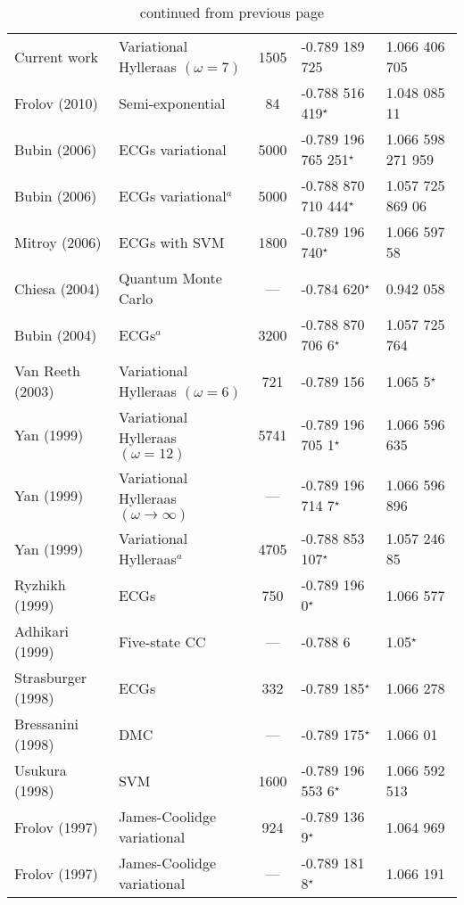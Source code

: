 \documentclass[Dissertation.tex]{subfiles}
\begin{document}
\begin{center}
\begin{longtable}{l l c l l}
\caption{continued from previous page}
\endlastfoot
\rowcolors{2}{gray!15}{white}
Current work & Variational Hylleraas $(\omega = 7)$ & 1505 & -0.789 189 725 & 1.066 406 705 \\
Frolov (2010) \cite{Frolov2010} & Semi-exponential & 84 & -0.788 516 419$^\star$ & 1.048 085 11 \\
Bubin (2006) \cite{Bubin2006} & ECGs variational & 5000 & -0.789 196 765 251$^\star$ & 1.066 598 271 959 \\
Bubin (2006) \cite{Bubin2006} & ECGs variational$^a$ & 5000 & -0.788 870 710 444$^\star$ & 1.057 725 869 06 \\
Mitroy (2006) \cite{Mitroy2006} & ECGs with SVM & 1800 & -0.789 196 740$^\star$ & 1.066 597 58 \\
Chiesa (2004) \cite{Chiesa2004} & Quantum Monte Carlo & --- & -0.784 620$^\star$ & 0.942 058 \\
Bubin (2004) \cite{Bubin2004} & ECGs$^a$ & 3200 & -0.788 870 706 6$^\star$ & 1.057 725 764 \\
Van Reeth (2003) \cite{VanReeth2003} & Variational Hylleraas $(\omega = 6)$ & 721 & -0.789 156 & 1.065 5$^\star$ \\
Yan (1999) \cite{Yan1999} & Variational Hylleraas $(\omega = 12)$ & 5741 & -0.789 196 705 1$^\star$ & 1.066 596 635 \\
Yan (1999) \cite{Yan1999} & Variational Hylleraas $(\omega \rightarrow \infty)$ & --- & -0.789 196 714 7$^\star$ & 1.066 596 896 \\
Yan (1999) \cite{Yan1999a} & Variational Hylleraas$^a$ & 4705 & -0.788 853 107$^\star$ & 1.057 246 85 \\
Ryzhikh (1999) \cite{Ryzhikh1999} & ECGs & 750 & -0.789 196 0$^\star$ & 1.066 577 \\
Adhikari (1999) \cite{Adhikari1999} & Five-state CC & --- & -0.788 6 & 1.05$^\star$ \\
Strasburger (1998) \cite{Strasburger1998} & ECGs & 332 & -0.789 185$^\star$ & 1.066 278 \\
Bressanini (1998) \cite{Bressanini1998} & DMC & --- & -0.789 175$^\star$ & 1.066 01 \\
Usukura (1998) \cite{Usukura1998} & SVM & 1600 & -0.789 196 553 6$^\star$ & 1.066 592 513 \\
Frolov (1997) \cite{Frolov1997a} & James-Coolidge variational & 924 & -0.789 136 9$^\star$ & 1.064 969 \\
Frolov (1997) \cite{Frolov1997a} & James-Coolidge variational & --- & -0.789 181 8$^\star$ & 1.066 191 \\

\end{longtable}
\end{center}
\end{document}
